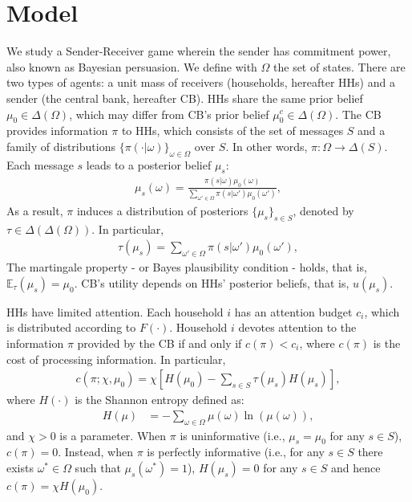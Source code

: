 \documentclass[12pt,a4paper]{article}
\begin{document}
\section{Model}

We study a Sender-Receiver game wherein the sender has commitment power, also known as Bayesian persuasion. We define with $\Omega$ the set of states. There are two types of agents: a unit mass of receivers (households, hereafter HHs) and a sender (the central bank, hereafter CB). HHs share the same prior belief $\mu_0 \in \Delta(\Omega)$, which may differ from CB's prior belief $\mu_0^c \in \Delta(\Omega)$.
The CB provides information $\pi$ to HHs, which consists of the set of messages $S$ and a family of distributions $\{\pi(\cdot|\omega)\}_{\omega\in\Omega}$ over $S$. In other words, $\pi: \Omega \to \Delta(S)$. Each message $s$ leads to a posterior belief $\mu_s$:
\begin{align}
    \mu_s(\omega) = \frac{\pi(s|\omega)\mu_0(\omega)}{\sum_{\omega'\in\Omega}\pi(s|\omega')\mu_0(\omega')},
\end{align}
As a result, $\pi$ induces a distribution of posteriors $\{\mu_s\}_{s \in S}$, denoted by $\tau \in \Delta(\Delta(\Omega))$. In particular, 
\begin{align}
\label{tau}
    \tau(\mu_s) = \sum_{\omega'\in\Omega}\pi(s|\omega')\mu_0(\omega'),
\end{align}
The martingale property - or Bayes plausibility condition - holds, that is, $\mathbb{E}_{\tau}(\mu_s)=\mu_0$. CB's utility depends on HHs' posterior beliefs, that is, $u(\mu_s)$.

HHs have limited attention. Each household $i$ has an attention budget $c_i$, which is distributed according to $F(\cdot)$. Household $i$ devotes attention to the information $\pi$ provided by the CB if and only if $c(\pi)<c_i$, where $c(\pi)$ is the cost of processing information. In particular,
\begin{align}
\label{cost}
    c(\pi; \chi, \mu_0) = \chi\left[H(\mu_0)-\sum_{s \in S}\tau(\mu_s) H(\mu_s)\right],
\end{align}
where $H(\cdot)$ is the Shannon entropy defined as:
\begin{align}
    H(\mu) & = -\sum_{\omega\in\Omega}\mu(\omega)\ln(\mu(\omega)),
\end{align}
and $\chi>0$ is a parameter. When $\pi$ is uninformative (i.e., $\mu_s = \mu_0$ for any $s\in S$), $c(\pi)=0$. Instead, when $\pi$ is perfectly informative (i.e., for any $s \in S$ there exists $\omega^* \in \Omega$ such that $\mu_s(\omega^*)=1$), $H(\mu_s)=0$ for any $s\in S$ and hence $c(\pi)=\chi H(\mu_0)$. 
\end{document}
